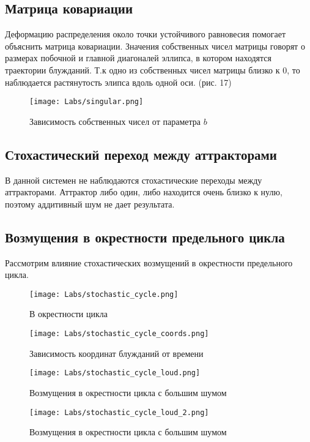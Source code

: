 \documentclass[a4paper,14pt]{extarticle}
\begin{document}
\newpage
\subsection{Матрица ковариации}
Деформацию распределения около точки устойчивого равновесия помогает объяснить матрица ковариации.
Значения собственных чисел матрицы говорят о размерах побочной и главной диагоналей эллипса, в котором находятся траектории блужданий. 
Т.к одно из собственных чисел матрицы близко к 0, то наблюдается растянутость элипса вдоль одной оси. (рис. 17)

\begin{figure}[!h]
\centering
\texttt{[image: Labs/singular.png]}
\caption{Зависимость собственных чисел от параметра $b$}
\label{sotch_singular}
\end{figure}

\newpage
\subsection{Стохастический переход между аттракторами}
В данной системен не наблюдаются стохастические переходы между аттракторами.
Аттрактор либо один, либо находится очень близко к нулю, поэтому аддитивный шум не дает результата.

\newpage
\subsection{Возмущения в окрестности предельного цикла}
Рассмотрим влияние стохастических возмущений в окрестности предельного цикла. 

\begin{figure}[!h]
\centering
\texttt{[image: Labs/stochastic\_cycle.png]}
\caption{В окрестности цикла}
\label{sotch_node}
\end{figure}

\newpage
\begin{figure}[!h]
\centering
\texttt{[image: Labs/stochastic\_cycle\_coords.png]}
\caption{Зависимость координат блужданий от времени}
\label{sotch_node_coord}
\end{figure}

\newpage
\begin{figure}[!h]
\centering
\texttt{[image: Labs/stochastic\_cycle\_loud.png]}
\caption{Возмущения в окрестности цикла с большим шумом}
\label{stoch_cycle_load}
\end{figure}

\begin{figure}[!h]
\centering
\texttt{[image: Labs/stochastic\_cycle\_loud\_2.png]}
\caption{Возмущения в окрестности цикла с большим шумом}
\label{stoch_cycle_load}
\end{figure}
\end{document}
